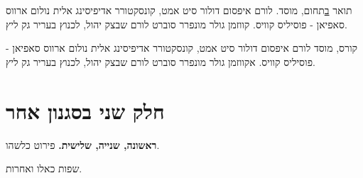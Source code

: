 {
תואר
\href{link-to-your-diploma.pdf}
בתחום, מוסד.}
{לורם איפסום דולור סיט אמט, קונסקטורר אדיפיסינג אלית נולום ארווס סאפיאן - פוסיליס קוויס.}
{קווזמן גולר מונפרר סוברט לורם שבצק יהול, לכנוץ בעריר גק ליץ.}

\par{\par}

{
קורס, מוסד}
{לורם איפסום דולור סיט אמט, קונסקטורר אדיפיסינג אלית נולום ארווס סאפיאן - פוסיליס קוויס. אקווזמן גולר מונפרר סוברט לורם שבצק יהול, לכנוץ בעריר גק ליץ.}
{}
{}

\section{חלק שני בסגנון אחר} %

{\textbf{ראשונה, שנייה, שלישית.} פירוט כלשהו.} 
{}
{}

{שפות כאלו ואחרות.}
{}
{}	
\unsetRTL
